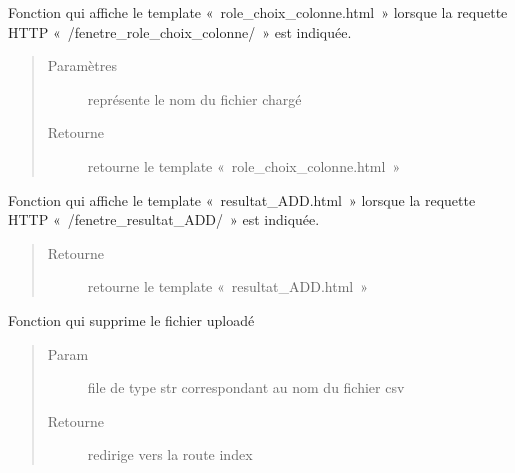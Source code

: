 \documentclass[letterpaper,10pt,french]{sphinxmanual}
\begin{document}
\begin{fulllineitems}
\label{\detokenize{gestionFlux:interface_web.gestionFlux.fenetre_role_choix_colonne}}
Fonction qui affiche le template « role\_choix\_colonne.html » lorsque la requette HTTP « /fenetre\_role\_choix\_colonne/ » est indiquée.
\begin{quote}\begin{description}
\item[{Paramètres}] \leavevmode
{} \textendash{} représente le nom du fichier chargé

\item[{Retourne}] \leavevmode
retourne le template « role\_choix\_colonne.html »

\end{description}\end{quote}

\end{fulllineitems}


\begin{fulllineitems}
\label{\detokenize{gestionFlux:interface_web.gestionFlux.fenetre_resultat_ADD}}
Fonction qui affiche le template « resultat\_ADD.html » lorsque la requette HTTP « /fenetre\_resultat\_ADD/ » est indiquée.
\begin{quote}\begin{description}
\item[{Retourne}] \leavevmode
retourne le template « resultat\_ADD.html »

\end{description}\end{quote}

\end{fulllineitems}


\begin{fulllineitems}
\label{\detokenize{gestionFlux:interface_web.gestionFlux.remove}}
Fonction qui supprime le fichier uploadé
\begin{quote}\begin{description}
\item[{Param}] \leavevmode
file de type str correspondant au nom du fichier csv

\item[{Retourne}] \leavevmode
redirige vers la route index

\end{description}\end{quote}

\end{fulllineitems}
\end{document}
